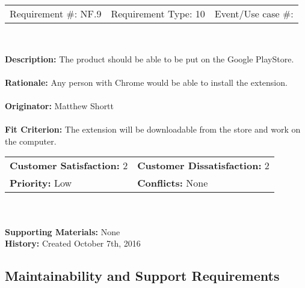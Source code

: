 \documentclass[12pt, titlepage]{article}
\begin{document}
\begin{framed}
	
	\begin{center}
		
		\begin{tabular}{ l c r }
			Requirement \#: NF.9 & Requirement Type: 10 & Event/Use case \#: \\
		\end{tabular} \\
	\end{center}
	\textbf{Description:} The product should be able to be put on the Google PlayStore.\\
	\\
	\textbf{Rationale:} Any person with Chrome would be able to install the extension.  \\
	\\
	\textbf{Originator:} Matthew Shortt \\
	\\
	\textbf{Fit Criterion:} The extension will be downloadable from the store and work on 
	the computer.  
	\\
	
	\begin{tabular}{ll}
		\textbf{Customer Satisfaction:} 2 & \textbf{Customer Dissatisfaction:} 2 \\
		\textbf{Priority:} Low & \textbf{Conflicts:} None\\
	\end{tabular} \\
	\\
	\textbf{Supporting Materials:} None \\
	\textbf{History:} Created October 7th, 2016
	
\end{framed}

\subsection{Maintainability and Support Requirements}
\end{document}
